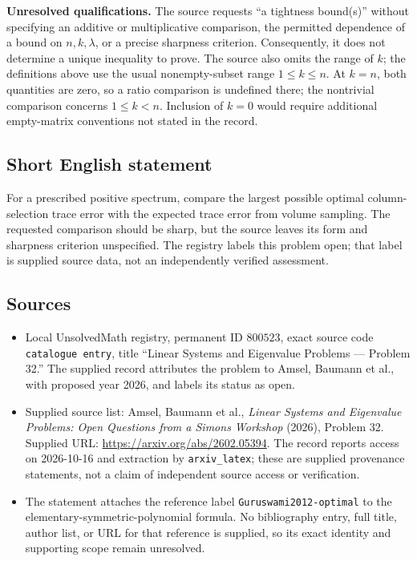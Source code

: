\documentclass[11pt]{article}
\begin{document}
\textbf{Unresolved qualifications.} The source requests ``a tightness bound(s)'' without specifying an additive or multiplicative comparison, the permitted dependence of a bound on \(n,k,\lambda\), or a precise sharpness criterion. Consequently, it does not determine a unique inequality to prove. The source also omits the range of \(k\); the definitions above use the usual nonempty-subset range \(1\leq k\leq n\). At \(k=n\), both quantities are zero, so a ratio comparison is undefined there; the nontrivial comparison concerns \(1\leq k<n\). Inclusion of \(k=0\) would require additional empty-matrix conventions not stated in the record.
\subsection{Short English statement}
For a prescribed positive spectrum, compare the largest possible optimal column-selection trace error with the expected trace error from volume sampling. The requested comparison should be sharp, but the source leaves its form and sharpness criterion unspecified. The registry labels this problem open; that label is supplied source data, not an independently verified assessment.
\subsection{Sources}
\begin{itemize}
\item Local UnsolvedMath registry, permanent ID \(800523\), exact source code \texttt{catalogue entry}, title ``Linear Systems and Eigenvalue Problems --- Problem 32.'' The supplied record attributes the problem to Amsel, Baumann et al., with proposed year 2026, and labels its status as open.
\item Supplied source list: Amsel, Baumann et al., \emph{Linear Systems and Eigenvalue Problems: Open Questions from a Simons Workshop} (2026), Problem 32. Supplied URL: \url{https://arxiv.org/abs/2602.05394}. The record reports access on 2026-10-16 and extraction by \texttt{arxiv\_latex}; these are supplied provenance statements, not a claim of independent source access or verification.
\item The statement attaches the reference label \texttt{Guruswami2012-optimal} to the elementary-symmetric-polynomial formula. No bibliography entry, full title, author list, or URL for that reference is supplied, so its exact identity and supporting scope remain unresolved.
\end{itemize}
\end{document}
